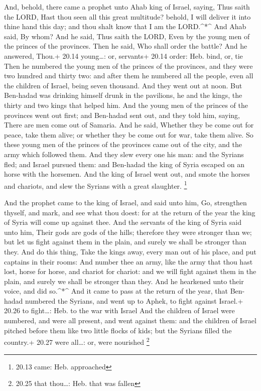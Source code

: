  And, behold, there came a prophet unto Ahab king of
Israel, saying, Thus saith the LORD, Hast thou seen all this great
multitude? behold, I will deliver it into thine hand this day; and thou
shalt know that I am the LORD.\^{}*\^{}  And Ahab said, By
whom? And he said, Thus saith the LORD, Even by the young men of the
princes of the provinces. Then he said, Who shall order the battle? And
he answered, Thou.+ 20.14 young\ldots: or, servants+ 20.14 order: Heb.
bind, or, tie  Then he numbered the young men of the
princes of the provinces, and they were two hundred and thirty two: and
after them he numbered all the people, even all the children of Israel,
being seven thousand.  And they went out at noon. But
Ben-hadad was drinking himself drunk in the pavilions, he and the kings,
the thirty and two kings that helped him.  And the young
men of the princes of the provinces went out first; and Ben-hadad sent
out, and they told him, saying, There are men come out of Samaria.
 And he said, Whether they be come out for peace, take them
alive; or whether they be come out for war, take them alive.
 So these young men of the princes of the provinces came
out of the city, and the army which followed them.  And
they slew every one his man: and the Syrians fled; and Israel pursued
them: and Ben-hadad the king of Syria escaped on an horse with the
horsemen.  And the king of Israel went out, and smote the
horses and chariots, and slew the Syrians with a great slaughter.
\footnote{20.13 came: Heb. approached}

 And the prophet came to the king of Israel, and said unto
him, Go, strengthen thyself, and mark, and see what thou doest: for at
the return of the year the king of Syria will come up against thee.
 And the servants of the king of Syria said unto him, Their
gods are gods of the hills; therefore they were stronger than we; but
let us fight against them in the plain, and surely we shall be stronger
than they.  And do this thing, Take the kings away, every
man out of his place, and put captains in their rooms:  And
number thee an army, like the army that thou hast lost, horse for horse,
and chariot for chariot: and we will fight against them in the plain,
and surely we shall be stronger than they. And he hearkened unto their
voice, and did so.\^{}*\^{}  And it came to pass at the
return of the year, that Ben-hadad numbered the Syrians, and went up to
Aphek, to fight against Israel.+ 20.26 to fight\ldots: Heb. to the war
with Israel  And the children of Israel were numbered, and
were all present, and went against them: and the children of Israel
pitched before them like two little flocks of kids; but the Syrians
filled the country.+ 20.27 were all\ldots: or, were nourished
\footnote{20.25 that thou\ldots: Heb. that was fallen}

